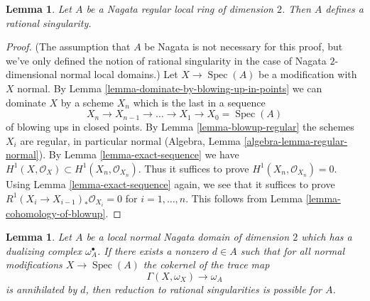 \documentclass{stacks-project}
\theoremstyle{plain}
\newtheorem{lemma}[subsection]{Lemma}
\theoremstyle{definition}
\theoremstyle{remark}
\numberwithin{equation}{subsection}
\def\Spec{\mathop{\mathrm{Spec}}}
\begin{document}
\begin{lemma}
\label{lemma-regular-rational}
Let $A$ be a Nagata regular local ring of dimension $2$. Then $A$ defines
a rational singularity.
\end{lemma}

\begin{proof}
(The assumption that $A$ be Nagata is not necessary for this proof,
but we've only defined the notion of rational singularity in the
case of Nagata $2$-dimensional normal local domains.)
Let $X \to \Spec(A)$ be a modification with $X$ normal. By
Lemma \ref{lemma-dominate-by-blowing-up-in-points}
we can dominate $X$ by a scheme $X_n$ which is the last in a sequence
$$
X_n \to X_{n - 1} \to \ldots \to X_1 \to X_0 = \Spec(A)
$$
of blowing ups in closed points. By Lemma \ref{lemma-blowup-regular}
the schemes $X_i$ are regular, in particular
normal (Algebra, Lemma \ref{algebra-lemma-regular-normal}).
By Lemma \ref{lemma-exact-sequence} we have
$H^1(X, \mathcal{O}_X) \subset H^1(X_n, \mathcal{O}_{X_n})$.
Thus it suffices to prove $H^1(X_n, \mathcal{O}_{X_n}) = 0$.
Using Lemma \ref{lemma-exact-sequence} again, we
see that it suffices to prove $R^1(X_i \to X_{i - 1})_*\mathcal{O}_{X_i} = 0$
for $i = 1, \ldots, n$. This follows from
Lemma \ref{lemma-cohomology-of-blowup}.
\end{proof}

\begin{lemma}
\label{lemma-bound-dualizing-implies-bound}
Let $A$ be a local normal Nagata domain of dimension $2$ which has a
dualizing complex $\omega_A^\bullet$. If there exists a nonzero $d \in A$
such that for all normal modifications $X \to \Spec(A)$ the cokernel of the
trace map
$$
\Gamma(X, \omega_X) \to \omega_A
$$
is annihilated by $d$, then reduction to rational singularities
is possible for $A$.
\end{lemma}
\end{document}
